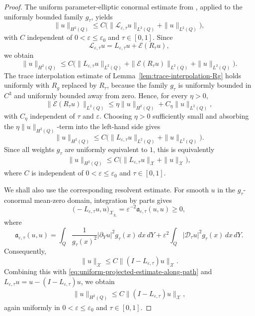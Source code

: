 \documentclass[11pt]{article}
\theoremstyle{definition}
\theoremstyle{remark}
\numberwithin{equation}{section}
\begin{document}
\begin{proof}
The uniform parameter-elliptic conormal estimate from
, applied to the uniformly
bounded family \(g_\tau\), yields
\[
\|u\|_{H^2(Q)}
\le
C\bigl(
\|\mathscr L_{\varepsilon,\tau}u\|_{L^2(Q)}
+
\|u\|_{L^2(Q)}
\bigr),
\]
with \(C\) independent of \(0<\varepsilon\le\varepsilon_0\) and
\(\tau\in[0,1]\). Since
\[
\mathscr L_{\varepsilon,\tau}u
=
L_{\varepsilon,\tau}u+\mathcal E(R_\tau u),
\]
we obtain
\[
\|u\|_{H^2(Q)}
\le
C\bigl(
\|L_{\varepsilon,\tau}u\|_{L^2(Q)}
+
\|\mathcal E(R_\tau u)\|_{L^2(Q)}
+
\|u\|_{L^2(Q)}
\bigr).
\]
The trace interpolation estimate of Lemma~\ref{lem:trace-interpolation-Rg}
holds uniformly with \(R_g\) replaced by \(R_\tau\), because the family
\(g_\tau\) is uniformly bounded in \(C^3\) and uniformly bounded away from
zero. Hence, for every \(\eta>0\),
\[
\|\mathcal E(R_\tau u)\|_{L^2(Q)}
\le
\eta\|u\|_{H^2(Q)}
+
C_\eta\|u\|_{L^2(Q)},
\]
with \(C_\eta\) independent of \(\tau\) and \(\varepsilon\). Choosing
\(\eta>0\) sufficiently small and absorbing the
\(\eta\|u\|_{H^2(Q)}\)-term into the left-hand side gives
\[
\|u\|_{H^2(Q)}
\le
C\bigl(
\|L_{\varepsilon,\tau}u\|_{L^2(Q)}
+
\|u\|_{L^2(Q)}
\bigr).
\]
Since all weights \(g_\tau\) are uniformly equivalent to \(1\), this is
equivalently
\begin{align}
\|u\|_{H^2(Q)}
\le
C\bigl(
\|L_{\varepsilon,\tau}u\|_{\mathcal X}
+
\|u\|_{\mathcal X}
\bigr),
\label{eq:uniform-projected-estimate-along-path}
\end{align}
where \(C\) is independent of \(0<\varepsilon\le\varepsilon_0\) and
\(\tau\in[0,1]\).

We shall also use the corresponding resolvent estimate. For smooth \(u\) in
the \(g_\tau\)-conormal mean-zero domain, integration by parts gives
\[
\bigl(-L_{\varepsilon,\tau}u,u\bigr)_{\mathcal X_{g_\tau}}
=
\varepsilon^{-2}\mathfrak a_{\varepsilon,\tau}(u,u)
\ge
0,
\]
where
\[
\mathfrak a_{\varepsilon,\tau}(u,u)
=
\int_Q
\frac1{g_\tau(x)^2}|\partial_Yu|^2 g_\tau(x)\,dx\,dY
+
\varepsilon^2
\int_Q
|\mathcal D_\tau u|^2 g_\tau(x)\,dx\,dY .
\]
Consequently,
\[
\|u\|_{\mathcal X}
\le
C\|(I-L_{\varepsilon,\tau})u\|_{\mathcal X}.
\]
Combining this with \eqref{eq:uniform-projected-estimate-along-path} and
\(L_{\varepsilon,\tau}u=u-(I-L_{\varepsilon,\tau})u\), we obtain
\begin{align}
\|u\|_{H^2(Q)}
\le
C\|(I-L_{\varepsilon,\tau})u\|_{\mathcal X},
\label{eq:uniform-resolvent-strong-estimate}
\end{align}
again uniformly in \(0<\varepsilon\le\varepsilon_0\) and \(\tau\in[0,1]\).


\end{proof}
\end{document}
